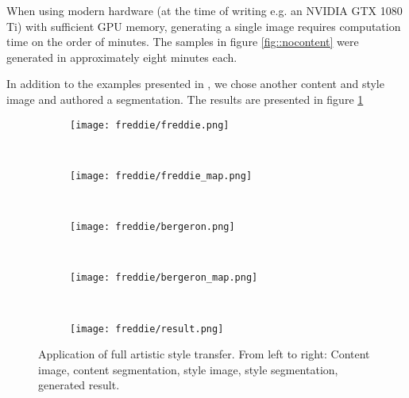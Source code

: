 When using modern hardware (at the time of writing e.g. an NVIDIA GTX 1080 Ti) with sufficient GPU memory, generating a single image requires computation time on the order of minutes. The samples in figure \ref{fig::nocontent} were generated in approximately eight minutes each. 

In addition to the examples presented in \cite{doodles2016}, we chose another content and style image and authored a segmentation. The results are presented in figure \ref{fig::freddie}

\begin{figure}
	\begin{subfigure}[t]{0.18\textwidth}
		\centering
		\texttt{[image: freddie/freddie.png]}
	\end{subfigure}%
	~
	\begin{subfigure}[t]{0.18\textwidth}
		\centering
		\texttt{[image: freddie/freddie\_map.png]}
	\end{subfigure}%
	~
	\begin{subfigure}[t]{0.18\textwidth}
		\centering
		\texttt{[image: freddie/bergeron.png]}
	\end{subfigure}
	~
	\begin{subfigure}[t]{0.18\textwidth}
		\centering
		\texttt{[image: freddie/bergeron\_map.png]}
	\end{subfigure}
	~
	\begin{subfigure}[t]{0.18\textwidth}
		\centering
		\texttt{[image: freddie/result.png]}
	\end{subfigure}
	
	\caption[]{Application of full artistic style transfer. From left to right: Content image, content segmentation, style image, style segmentation, generated result.}
	\label{fig::freddie}
\end{figure}